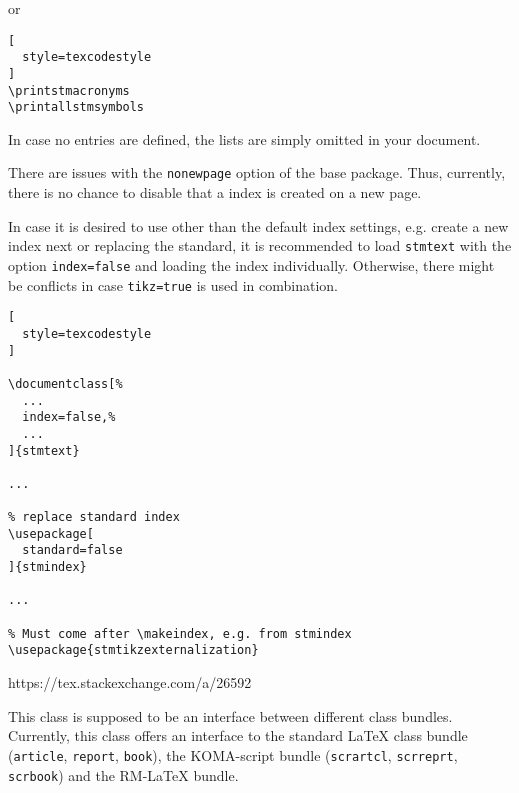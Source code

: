 \documentclass[%
  type=article,%
  layout=koma,%
  page=false,%
  cleveref=true,%
  conditionallox=true,%
  conditionalloxnewpage=true,%
  date=true,%
  glossaries=true,%
  hyperref=true,%
  index=true,%
  listings=true%
]{stmtext}
\begin{document}
or

\begin{lstlisting}[
  style=texcodestyle
]
\printstmacronyms
\printallstmsymbols
\end{lstlisting}

In case no entries are defined, the lists are simply omitted in your document.%

\label{sec:options:index}


There are issues with the \texttt{nonewpage} option of the base package. Thus, currently, there is no chance to disable that a index is created on a new page.

In case it is desired to use other than the default index settings, e.g. create a new index next or replacing the standard, it is recommended to load \texttt{stmtext} with the option \texttt{index=false} and loading the index individually. Otherwise, there might be conflicts in case \texttt{tikz=true} is used in combination.

\begin{lstlisting}[
  style=texcodestyle
]

\documentclass[%
  ...
  index=false,%
  ...
]{stmtext}

...

% replace standard index
\usepackage[
  standard=false
]{stmindex}

...

% Must come after \makeindex, e.g. from stmindex
\usepackage{stmtikzexternalization}
\end{lstlisting}


\label{sec:options:hyperref}

https://tex.stackexchange.com/a/26592


\label{sec:options:layout}

This class is supposed to be an interface between different class bundles. Currently, this class offers an interface to the standard \LaTeX{} class bundle (\texttt{article}, \texttt{report}, \texttt{book}), the KOMA-script bundle (\texttt{scrartcl}, \texttt{scrreprt}, \texttt{scrbook}) and the RM-\LaTeX{} bundle.
\end{document}
